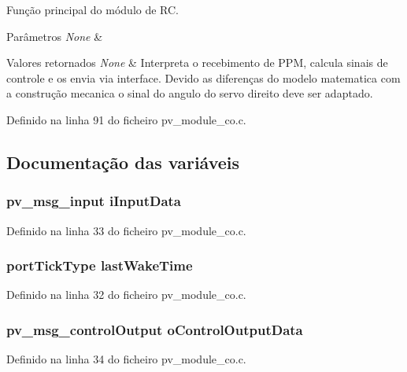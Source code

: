 Função principal do módulo de R\-C. 


\begin{DoxyParams}{Parâmetros}
{\em None} & \\
\hline
\end{DoxyParams}

\begin{DoxyRetVals}{Valores retornados}
{\em None} & Interpreta o recebimento de P\-P\-M, calcula sinais de controle e os envia via interface. Devido as diferenças do modelo matematica com a construção mecanica o sinal do angulo do servo direito deve ser adaptado. \\
\hline
\end{DoxyRetVals}


Definido na linha 91 do ficheiro pv\-\_\-module\-\_\-co.\-c.



\subsection{Documentação das variáveis}
\hypertarget{group__app__co_gac40b8cfe5fd2000670ad57fe3e75ec89}{
\subsubsection[{i\-Input\-Data}]{\setlength{\rightskip}{0pt plus 5cm}pv\-\_\-msg\-\_\-input i\-Input\-Data}}\label{group__app__co_gac40b8cfe5fd2000670ad57fe3e75ec89}


Definido na linha 33 do ficheiro pv\-\_\-module\-\_\-co.\-c.

\hypertarget{group__app__co_gaa8db3871cb5f64abbd94ddd5a1db73a6}{
\subsubsection[{last\-Wake\-Time}]{\setlength{\rightskip}{0pt plus 5cm}port\-Tick\-Type last\-Wake\-Time}}\label{group__app__co_gaa8db3871cb5f64abbd94ddd5a1db73a6}


Definido na linha 32 do ficheiro pv\-\_\-module\-\_\-co.\-c.

\hypertarget{group__app__co_ga0a14ca4568444d2d76c256fa91585cdf}{
\subsubsection[{o\-Control\-Output\-Data}]{\setlength{\rightskip}{0pt plus 5cm}pv\-\_\-msg\-\_\-control\-Output o\-Control\-Output\-Data}}\label{group__app__co_ga0a14ca4568444d2d76c256fa91585cdf}


Definido na linha 34 do ficheiro pv\-\_\-module\-\_\-co.\-c.

